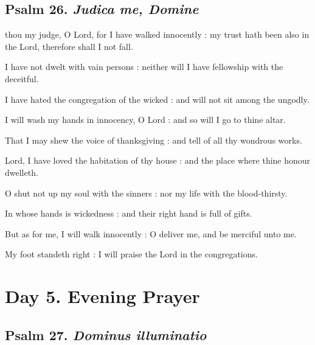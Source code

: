 \subsection{Psalm 26. \textit{Judica me, Domine}}

 thou my judge, O Lord, for I have walked innocently : my trust hath been also in the Lord, therefore shall I not fall.\par
{}
I have not dwelt with vain persons : neither will I have fellowship with the deceitful.\par
{}I have hated the congregation of the wicked : and will not sit among the ungodly.\par
{}I will wash my hands in innocency, O Lord : and so will I go to thine altar.\par
{}That I may shew the voice of thanksgiving : and tell of all thy wondrous works.\par
{}Lord, I have loved the habitation of thy house : and the place where thine honour dwelleth.\par
{}O shut not up my soul with the sinners : nor my life with the blood-thirsty.\par
{}In whose hands is wickedness : and their right hand is full of gifts.\par
{}But as for me, I will walk innocently : O deliver me, and be merciful unto me.\par
{}My foot standeth right : I will praise the Lord in the congregations.\par

\section*{Day 5. Evening Prayer}

\subsection{Psalm 27. \textit{Dominus illuminatio}}

